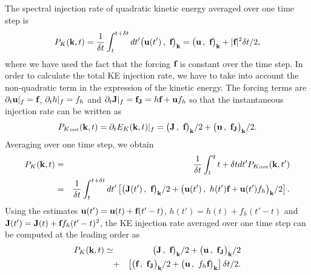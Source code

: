 The spectral injection rate of quadratic kinetic energy averaged over
one time step is
\begin{equation}
P_{K}(\textbf{k}, t) 
= \frac{1}{\delta t} \int_t^{t+\delta t} dt'
\big( \textbf{u}(t') \, , \ \textbf{f} \big)_{\textbf{k}}
= 
\big( \textbf{u} \, , \ \textbf{f} \big)_{\textbf{k}}
+ 
|\textbf{f}|^2 \delta t /2,
\end{equation}
where we have used the fact that the forcing $\textbf{f}$ is constant over
the time step.
%
In order to calculate the total KE injection rate, we have to take
into account the non-quadratic term in the expression of the kinetic
energy.
%
The forcing terms are $\partial_t \textbf{u} |_f = \textbf{f}$, $\partial_t h |_f = f_h$ and $
\partial_t \textbf{J} |_f = \textbf{f}_{\textbf{J}} = h \textbf{f} + \textbf{u} f_h$ so that the instantaneous
injection rate can be written as
\begin{equation}
 P_{K\mbox{\tiny inst}}(\kk, t) 
= \p_t  E_K(\kk, t)|_f 
= \scalarprod{\JJ}{\ff}/2 + \scalarprod{\uu}{\ff_\JJ}/2.
\end{equation}
Averaging over one time step, we obtain
\begin{eqnarray}
 P_{K}(\kk, t) 
&=& \frac{1}{\delta t} \int_t^q{t+\delta t} 
dt'  P_{K\mbox{\tiny inst}}(\kk, t') 
\\
&=& \frac{1}{\delta t} \int_t^{t+\delta t} dt'
\left[
\scalarprod{\JJ(t')}{\ff}/2
+ \scalarprod{\uu(t')}{h(t') \ff + \uu(t') f_h}/2 
\right].
\end{eqnarray}
Using the estimates $\textbf{u}(t') = \textbf{u}(t)+ \textbf{f} (t'-t)$, $h(t') = h(t)+ f_h
(t'-t)$ and $\textbf{J}(t') = \textbf{J}(t)+ \textbf{f} f_h (t'-t)^2$, the KE injection
rate averaged over one time step can be computed at the leading order
as
\begin{eqnarray}
 P_{K}(\textbf{k}, t) \simeq 
& & \big( \textbf{J} \, , \ \textbf{f} \big)_{\textbf{k}}/2 + \big( \textbf{u} \, , \ \textbf{f}_{\textbf{J}} \big)_{\textbf{k}}/2 \nonumber\\
&+& \left[  
\big( \textbf{f} \, , \ \textbf{f}_{\textbf{J}} \big)_{\textbf{k}}/2  
+ \big( \textbf{u} \, , \ f_h\textbf{f} \big)_{\textbf{k}} 
\right] \delta t /2.
\end{eqnarray}
